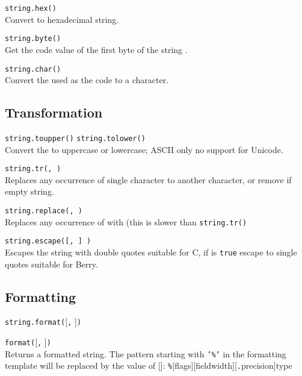 \hangpar \texttt{string.hex(}\texttt{)}\\
Convert  to hexadecimal string.

\hangpar \texttt{string.byte(}\texttt{)}\\
Get the code value of the first byte of the string .

\hangpar \texttt{string.char(}\texttt{)}\\
Convert the  used as the code to a character.

\subsection*{Transformation}

\hangpar \texttt{string.toupper(}\texttt{)} \texttt{string.tolower(}\texttt{)}\\
Convert the  to uppercase or lowercase; ASCII only no support for Unicode.

\hangpar \texttt{string.tr(}\texttt{, }\texttt{)}\\
Replaces any occurrence of single character  to another character, or remove if empty string.

\hangpar \texttt{string.replace(}\texttt{, }\texttt{)}\\
Replaces any occurrence of  with  (this is slower than \texttt{string.tr()}

\hangpar \texttt{string.escape(}\texttt{[, }\texttt{] )}\\
Escapes the string with double quotes suitable for C, if  is \texttt{true} escape to single quotes suitable for Berry.

\subsection*{Formatting}

\hangpar \texttt{string.format(}[\texttt{,} ]\texttt{)}

\hangpar \texttt{format(}[\texttt{,} ]\texttt{)}\\
Returns a formatted string. The pattern starting with \texttt{'\%'} in the formatting template  will be replaced by the value of []: \texttt{\%}[\textsf{flags}][\textsf{fieldwidth}][\texttt{.}\textsf{precision}]\textsf{type}\\

